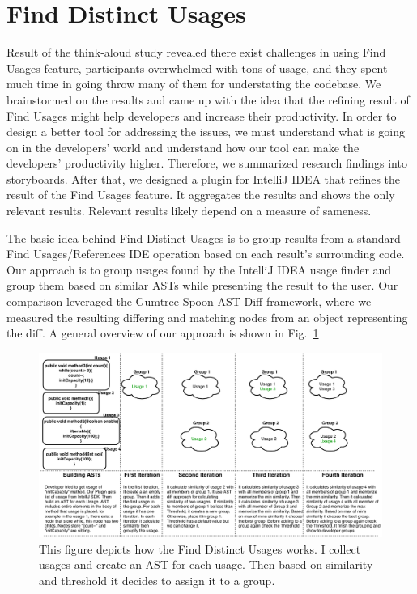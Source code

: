 \documentclass[conference]{IEEEtran}
\begin{document}
\section{Find Distinct Usages}
Result of the think-aloud study revealed there exist challenges in using Find Usages feature, participants overwhelmed with tons of usage, and they spent much time in going throw many of them for understating the codebase. We brainstormed on the results and came up with the idea that the refining result of Find Usages might help developers and increase their productivity. In order to design a better tool for addressing the issues, we must understand what is going on in the developers' world and understand how our tool can make the developers' productivity higher. Therefore, we summarized research findings into storyboards. After that, we designed a plugin for IntelliJ IDEA that refines the result of the Find Usages feature. It aggregates the results and shows the only relevant results. Relevant results likely depend on a measure of sameness.\par
The basic idea behind Find Distinct Usages is to group results from a standard Find Usages/References IDE operation based on each result's surrounding code. Our approach is to group usages found by the IntelliJ IDEA usage finder and group them based on similar ASTs while presenting the result to the user. Our comparison leveraged the Gumtree Spoon AST Diff framework, where we measured the resulting differing and matching nodes from an object representing the diff. A general overview of our approach is shown in Fig.~\ref{fig:general} 

\begin{figure}
    \centering
    \includegraphics [width=\textwidth,keepaspectratio,clip]{figures/generlView.pdf}
    \caption{This figure depicts how the Find Distinct Usages works. I collect usages and create an AST for each usage. Then based on similarity and threshold it decides to assign it to a group. }
\label{fig:general}
\end{figure}
\end{document}
